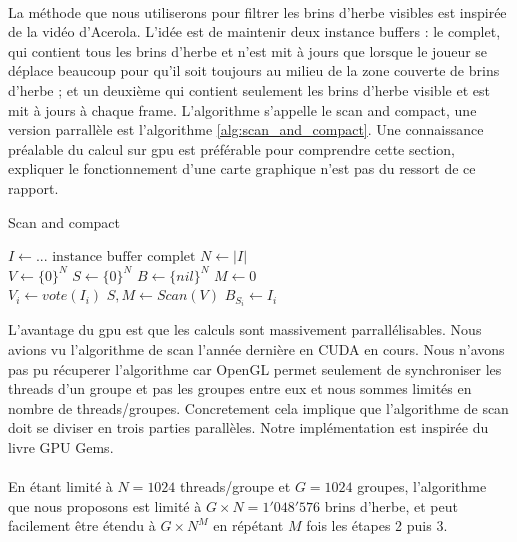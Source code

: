 \documentclass[11pt]{article} %
\begin{document}
\paragraph{}
La méthode que nous utiliserons pour filtrer les brins d'herbe visibles est inspirée de la vidéo d'Acerola\cite{grass_rendering}. L'idée est de maintenir deux instance buffers : le complet, qui contient tous les brins d'herbe et n'est mit à jours que lorsque le joueur se déplace beaucoup pour qu'il soit toujours au milieu de la zone couverte de brins d'herbe ; et un deuxième qui contient seulement les brins d'herbe visible et est mit à jours à chaque frame. L'algorithme s'appelle le scan and compact, une version parrallèle est l'algorithme \ref{alg:scan_and_compact}. Une connaissance préalable du calcul sur gpu est préférable pour comprendre cette section, expliquer le fonctionnement d'une carte graphique n'est pas du ressort de ce rapport.

\begin{algorithm}
\caption{Scan and compact}\label{alg:scan_and_compact}
\begin{algorithmic}
\State $I \gets \text{... instance buffer complet}$
\State $N \gets |I|$
\\
\State $V \gets \{0\}^N$ 
\State $S \gets \{0\}^N$ 
\State $B \gets \{nil\}^N$ 
\State $M \gets 0$ 
\\
	\State $V_i \gets vote(I_i)$ 
\EndParFor
\State $S,M\gets Scan(V)$
		\State $B_{S_i}\gets I_i$
	\EndIf
\EndParFor
\end{algorithmic}
\end{algorithm}

L'avantage du gpu est que les calculs sont massivement parrallélisables. Nous avions vu l'algorithme de scan l'année dernière en CUDA en cours. Nous n'avons pas pu récuperer l'algorithme car OpenGL permet seulement de synchroniser les threads d'un groupe et pas les groupes entre eux et nous sommes limités en nombre de threads/groupes. Concretement cela implique que l'algorithme de scan doit se diviser en trois parties parallèles. Notre implémentation est inspirée du livre GPU Gems\cite{scan_algorithm}.

\paragraph{}
En étant limité à $N=1024$ threads/groupe et $G=1024$ groupes, l'algorithme que nous proposons est limité à $G\times N=1'048'576$ brins d'herbe, et peut facilement être étendu à $G\times N^M$ en répétant $M$ fois les étapes 2 puis 3.
\end{document}
